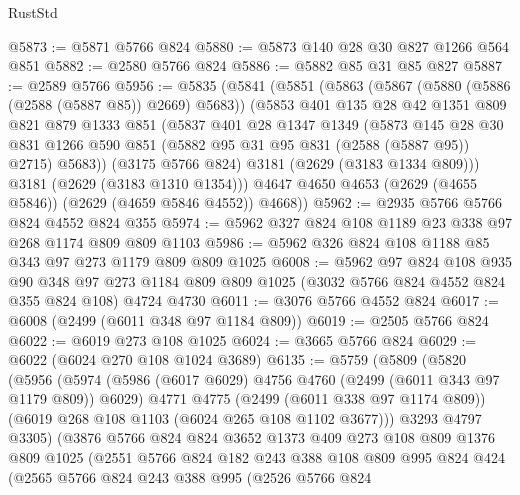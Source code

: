 \begin{lexlean}{RustStd}
\begin{coremodule}
@5873 := @5871 @5766 @824
@5880 := @5873 @140 @28 @30 @827 @1266 @564 @851
@5882 := @2580 @5766 @824
@5886 := @5882 @85 @31 @85 @827
@5887 := @2589 @5766
@5956 := @5835
    (@5841
      (@5851
        (@5863
          (@5867 (@5880 (@5886 (@2588 (@5887 @85)) @2669) @5683))
          (@5853
            @401
            @135
            @28
            @42
            @1351
            @809
            @821
            @879
            @1333
            @851
            (@5837
              @401
              @28
              @1347
              @1349
              (@5873
                @145
                @28
                @30
                @831
                @1266
                @590
                @851
                (@5882 @95 @31 @95 @831 (@2588 (@5887 @95)) @2715)
                @5683))
            (@3175 @5766 @824)
            @3181
            (@2629 (@3183 @1334 @809)))
          @3181
          (@2629 (@3183 @1310 @1354)))
        @4647
        @4650
        @4653
        (@2629 (@4655 @5846))
        (@2629 (@4659 @5846 @4552))
        @4668))
@5962 := @2935 @5766 @5766 @824 @4552 @824 @355
@5974 := @5962 @327 @824 @108 @1189 @23 @338 @97 @268 @1174 @809 @809 @1103
@5986 := @5962 @326 @824 @108 @1188 @85 @343 @97 @273 @1179 @809 @809 @1025
@6008 := @5962
    @97
    @824
    @108
    @935
    @90
    @348
    @97
    @273
    @1184
    @809
    @809
    @1025
    (@3032 @5766 @824 @4552 @824 @355 @824 @108)
    @4724
    @4730
@6011 := @3076 @5766 @4552 @824
@6017 := @6008 (@2499 (@6011 @348 @97 @1184 @809))
@6019 := @2505 @5766 @824
@6022 := @6019 @273 @108 @1025
@6024 := @3665 @5766 @824
@6029 := @6022 (@6024 @270 @108 @1024 @3689)
@6135 := @5759
    (@5809
      (@5820
        (@5956
          (@5974
            (@5986 (@6017 @6029) @4756 @4760 (@2499 (@6011 @343 @97 @1179 @809)) @6029)
            @4771
            @4775
            (@2499 (@6011 @338 @97 @1174 @809))
            (@6019 @268 @108 @1103 (@6024 @265 @108 @1102 @3677)))
          @3293
          @4797
          @3305)
        (@3876
          @5766
          @824
          @824
          @3652
          @1373
          @409
          @273
          @108
          @809
          @1376
          @809
          @1025
          (@2551
            @5766
            @824
            @182
            @243
            @388
            @108
            @809
            @995
            @824
            @424
            (@2565
              @5766
              @824
              @243
              @388
              @995
              (@2526
                @5766
                @824

\end{coremodule}
\end{lexlean}
